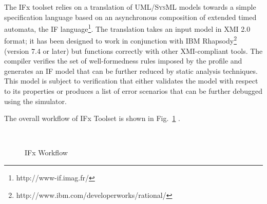 \documentclass[a4paper,twoside]{article}
\def\sysml{\textsc{SysML}}
\def\uml{\textsc{UML}}
\begin{document}
The IFx toolset relies on a translation of \uml{}/\sysml{} models towards a simple specification language based on an asynchronous composition of extended timed automata, the IF language\footnote{http://www-if.imag.fr/}. The translation takes an input model in XMI 2.0 format; it has been designed to work in conjunction with IBM Rhapsody\footnote{http://www.ibm.com/developerworks/rational/} (version 7.4 or later) but functions correctly with other XMI-compliant tools. The compiler verifies the set of well-formedness rules imposed by the profile and generates an IF model that can be further reduced by static analysis techniques. This model is subject to verification that either validates the model with respect to its properties or produces a list of error scenarios that can be further debugged using the simulator.


The overall workflow  of IFx Toolset is shown in Fig.~\ref{fig:flow} \cite{test12}.


\begin{figure}[!h]
  \vspace{8cm}~
  \centering
  {}
  \caption{IFx Workflow}
  \label{fig:flow}
 \end{figure}
 
\end{document}
